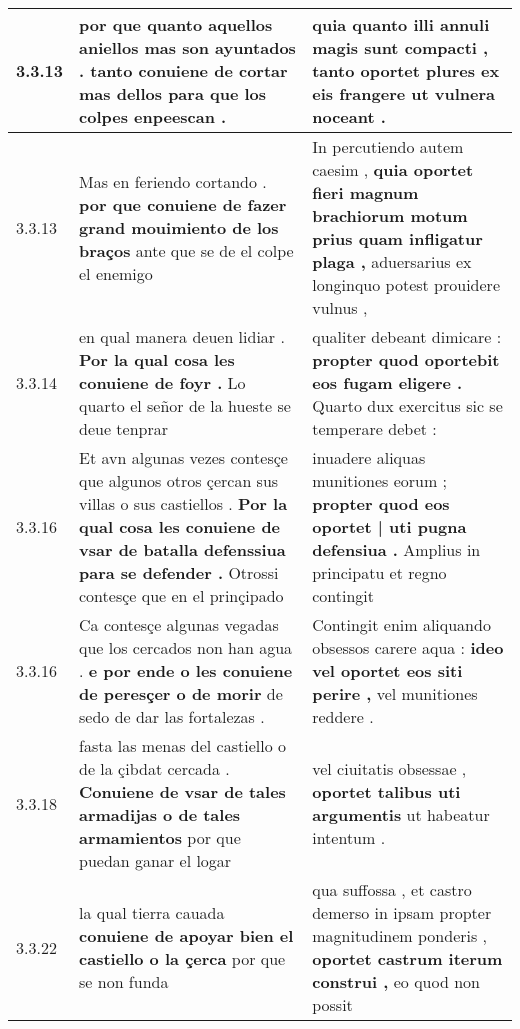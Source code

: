 \begin{tabular}{|p{1cm}|p{6.5cm}|p{6.5cm}|}
3.3.13 & por que quanto aquellos aniellos mas son ayuntados . \textbf{ tanto conuiene de cortar mas dellos } para que los colpes enpeescan . & quia quanto illi annuli magis sunt compacti , \textbf{ tanto oportet plures ex eis frangere } ut vulnera noceant . \\\hline
3.3.13 & Mas en feriendo cortando . \textbf{ por que conuiene de fazer grand mouimiento de los braços } ante que se de el colpe el enemigo & In percutiendo autem caesim , \textbf{ quia oportet fieri magnum brachiorum motum prius quam infligatur plaga , } aduersarius ex longinquo potest prouidere vulnus , \\\hline
3.3.14 & en qual manera deuen lidiar . \textbf{ Por la qual cosa les conuiene de foyr . } Lo quarto el señor de la hueste se deue tenprar & qualiter debeant dimicare : \textbf{ propter quod oportebit eos fugam eligere . } Quarto dux exercitus sic se temperare debet : \\\hline
3.3.16 & Et avn algunas vezes contesçe que algunos otros çercan sus villas o sus castiellos . \textbf{ Por la qual cosa les conuiene de vsar de batalla defenssiua para se defender . } Otrossi contesçe que en el prinçipado & inuadere aliquas munitiones eorum ; \textbf{ propter quod eos oportet | uti pugna defensiua . } Amplius in principatu et regno contingit \\\hline
3.3.16 & Ca contesçe algunas vegadas que los cercados non han agua . \textbf{ e por ende o les conuiene de peresçer o de morir } de sedo de dar las fortalezas . & Contingit enim aliquando obsessos carere aqua : \textbf{ ideo vel oportet eos siti perire , } vel munitiones reddere . \\\hline
3.3.18 & fasta las menas del castiello o de la çibdat cercada . \textbf{ Conuiene de vsar de tales armadijas o de tales armamientos } por que puedan ganar el logar & vel ciuitatis obsessae , \textbf{ oportet talibus uti argumentis } ut habeatur intentum . \\\hline
3.3.22 & la qual tierra cauada \textbf{ conuiene de apoyar bien el castiello o la çerca } por que se non funda & qua suffossa , et castro demerso in ipsam propter magnitudinem ponderis , \textbf{ oportet castrum iterum construi , } eo quod non possit \\\hline

\end{tabular}
